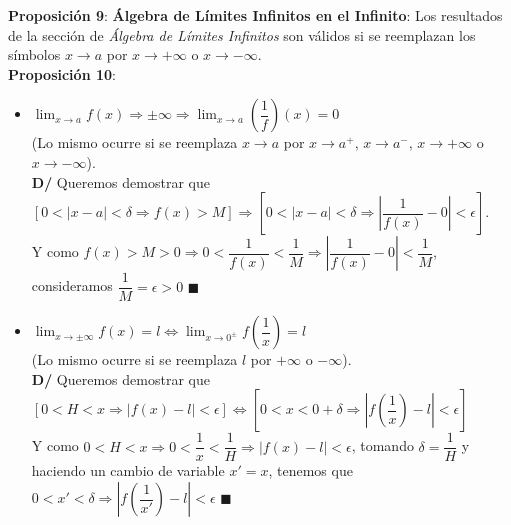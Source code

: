 \documentclass[11pt,a4paper]{article}
\newcommand*{\QEDA}{\null\nobreak\hfill\ensuremath{\blacksquare}}
\begin{document}
\noindent \textbf{Proposici\'on 9}: \textbf{\'Algebra de L\'imites Infinitos en el Infinito}: Los resultados de la secci\'on de \textit{\'Algebra de L\'imites Infinitos} son v\'alidos si se reemplazan los s\'imbolos $x\to a$ por $x\to +\infty$ o $x\to -\infty$.\\


\noindent \textbf{Proposici\'on 10}:
\begin{itemize}
\item $\displaystyle{\lim_{x \to a} f(x) \Rightarrow \pm\infty} \Rightarrow \displaystyle{\lim_{x \to a} \left(\dfrac{1}{f}\right)(x) = 0}$ \\ (Lo mismo ocurre si se reemplaza $x\to a$ por $x\to a^+$, $x\to a^-$, $x\to +\infty$ o $x\to -\infty$).\\
\textbf{D/} Queremos demostrar que\\ $\left[0<|x-a|<\delta \Rightarrow f(x) > M \right] \Rightarrow \left[0<|x-a|<\delta \Rightarrow \left|\dfrac{1}{f(x)}-0\right|<\epsilon\right]$. \\
Y como $f(x)>M>0 \Rightarrow 0 <\dfrac{1}{f(x)}<\dfrac{1}{M} \Rightarrow \left|\dfrac{1}{f(x)}-0\right| < \dfrac{1}{M}$, consideramos $\dfrac{1}{M} = \epsilon > 0$ \QEDA\\

\item $\displaystyle{\lim_{x \to \pm\infty} f(x) = l} \iff \displaystyle{\lim_{x \to 0^\pm} f\left(\dfrac{1}{x}\right) = l}$ \\ (Lo mismo ocurre si se reemplaza $l$ por $+\infty$ o $-\infty$).\\
\textbf{D/} Queremos demostrar que\\ $\left[ 0<H<x \Rightarrow |f(x)-l| < \epsilon \right] \iff \left[ 0 < x < 0 + \delta  \Rightarrow \left|f\left(\dfrac{1}{x}\right)-l\right| < \epsilon \right]$\\
Y como $0<H<x \Rightarrow 0<\dfrac{1}{x} < \dfrac{1}{H} \Rightarrow |f(x)-l|<\epsilon$, tomando $\delta = \dfrac{1}{H}$ y haciendo un cambio de variable $x'=x$, tenemos que $0< x' < \delta \Rightarrow \left|f\left(\dfrac{1}{x'}\right)-l\right|<\epsilon$ \QEDA
\end{itemize}
\end{document}

